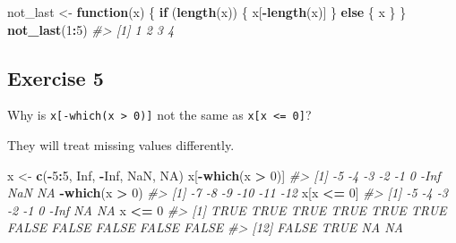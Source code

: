\documentclass[]{book}
\newenvironment{Shaded}{\begin{snugshade}}{\end{snugshade}}
\newcommand{\CommentTok}[1]{\textcolor[rgb]{0.56,0.35,0.01}{\textit{#1}}}
\newcommand{\ControlFlowTok}[1]{\textcolor[rgb]{0.13,0.29,0.53}{\textbf{#1}}}
\newcommand{\DecValTok}[1]{\textcolor[rgb]{0.00,0.00,0.81}{#1}}
\newcommand{\KeywordTok}[1]{\textcolor[rgb]{0.13,0.29,0.53}{\textbf{#1}}}
\newcommand{\NormalTok}[1]{#1}
\newcommand{\OperatorTok}[1]{\textcolor[rgb]{0.81,0.36,0.00}{\textbf{#1}}}
\newcommand{\OtherTok}[1]{\textcolor[rgb]{0.56,0.35,0.01}{#1}}
\newcommand{\StringTok}[1]{\textcolor[rgb]{0.31,0.60,0.02}{#1}}
\theoremstyle{definition}
\theoremstyle{definition}
\theoremstyle{definition}
\theoremstyle{remark}
\begin{document}
\begin{Shaded}
\begin{Highlighting}[]
\NormalTok{not_last <-}\StringTok{ }\ControlFlowTok{function}\NormalTok{(x) \{}
  \ControlFlowTok{if}\NormalTok{ (}\KeywordTok{length}\NormalTok{(x)) \{}
\NormalTok{    x[}\OperatorTok{-}\KeywordTok{length}\NormalTok{(x)]}
\NormalTok{  \} }\ControlFlowTok{else}\NormalTok{ \{}
\NormalTok{    x}
\NormalTok{  \}}
\NormalTok{\}}
\KeywordTok{not_last}\NormalTok{(}\DecValTok{1}\OperatorTok{:}\DecValTok{5}\NormalTok{)}
\CommentTok{#> [1] 1 2 3 4}
\end{Highlighting}
\end{Shaded}

\begin{Shaded}
\end{Shaded}

\hypertarget{exercise-5-15}{%
\subsection{Exercise 5}\label{exercise-5-15}}

Why is \texttt{x{[}-which(x\ \textgreater{}\ 0){]}} not the same as
\texttt{x{[}x\ \textless{}=\ 0{]}}?

They will treat missing values differently.

\begin{Shaded}
\begin{Highlighting}[]
\NormalTok{x <-}\StringTok{ }\KeywordTok{c}\NormalTok{(}\OperatorTok{-}\DecValTok{5}\OperatorTok{:}\DecValTok{5}\NormalTok{, }\OtherTok{Inf}\NormalTok{, }\OperatorTok{-}\OtherTok{Inf}\NormalTok{, }\OtherTok{NaN}\NormalTok{, }\OtherTok{NA}\NormalTok{)}
\NormalTok{x[}\OperatorTok{-}\KeywordTok{which}\NormalTok{(x }\OperatorTok{>}\StringTok{ }\DecValTok{0}\NormalTok{)]}
\CommentTok{#> [1]   -5   -4   -3   -2   -1    0 -Inf  NaN   NA}
\OperatorTok{-}\KeywordTok{which}\NormalTok{(x }\OperatorTok{>}\StringTok{ }\DecValTok{0}\NormalTok{)}
\CommentTok{#> [1]  -7  -8  -9 -10 -11 -12}
\NormalTok{x[x }\OperatorTok{<=}\StringTok{ }\DecValTok{0}\NormalTok{]}
\CommentTok{#> [1]   -5   -4   -3   -2   -1    0 -Inf   NA   NA}
\NormalTok{x }\OperatorTok{<=}\StringTok{ }\DecValTok{0}
\CommentTok{#>  [1]  TRUE  TRUE  TRUE  TRUE  TRUE  TRUE FALSE FALSE FALSE FALSE FALSE}
\CommentTok{#> [12] FALSE  TRUE    NA    NA}
\end{Highlighting}
\end{Shaded}
\end{document}
